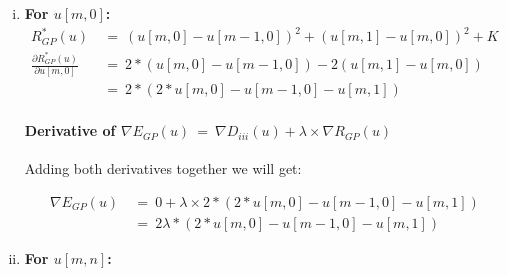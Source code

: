 \documentclass{report}
\begin{document}
\begin{enumerate}[(i)]
\begin{align*}
							& = \ 2 * (2 * u[0,n] - u[1,n] - u[0,n-1])
						\end{align*}
						\vspace{-1cm} \paragraph{Derivative of $\nabla E_{GP}(u) \ = \ \nabla D_{ii}(u) + \lambda \times \nabla R_{GP}(u)$}
						\startsubsection
							Adding both derivatives together we will get:
						\closesection
						\begin{adjustwidth}{-6em}{}
							\vspace{-0.6cm}
							\begin{align*}
								\nabla E_{GP}(u) \ & = \ 0 + \lambda \times 2 * (2 * u[0,n] - u[1,n] - u[0,n-1]) \\
								& = \ 2\lambda * (2 * u[0,n] - u[1,n] - u[0,n-1])
							\end{align*}
						\end{adjustwidth}
						\item \textbf{For $u[m,0]$:}
						\begin{align*}
							R_{GP}^*(u) \ & = \ (u[m,0] - u[m-1,0])^2 + (u[m,1] - u[m,0])^2 + K \\
							\frac{\partial R_{GP}^*(u)}{\partial u[m,0]} \ & = \ 2 * (u[m,0] - u[m-1,0]) - 2 (u[m,1] - u[m,0]) \\
							& = \ 2 * (2 * u[m,0] - u[m-1,0] - u[m,1])
						\end{align*}
						\vspace{-1cm} \paragraph{Derivative of $\nabla E_{GP}(u) \ = \ \nabla D_{iii}(u) + \lambda \times \nabla R_{GP}(u)$}
						\startsubsection
							Adding both derivatives together we will get:
						\closesection
						\begin{adjustwidth}{-6em}{}
							\vspace{-0.6cm}
							\begin{align*}
								\nabla E_{GP}(u) \ & = \ 0 + \lambda \times 2 * (2 * u[m,0] - u[m-1,0] - u[m,1]) \\
								& = \ 2\lambda * (2 * u[m,0] - u[m-1,0] - u[m,1])
							\end{align*}
						\end{adjustwidth}
						\item \textbf{For $u[m,n]$:}
						\begin{adjustwidth}{-8em}{}

\end{adjustwidth}
\end{enumerate}
\end{document}
